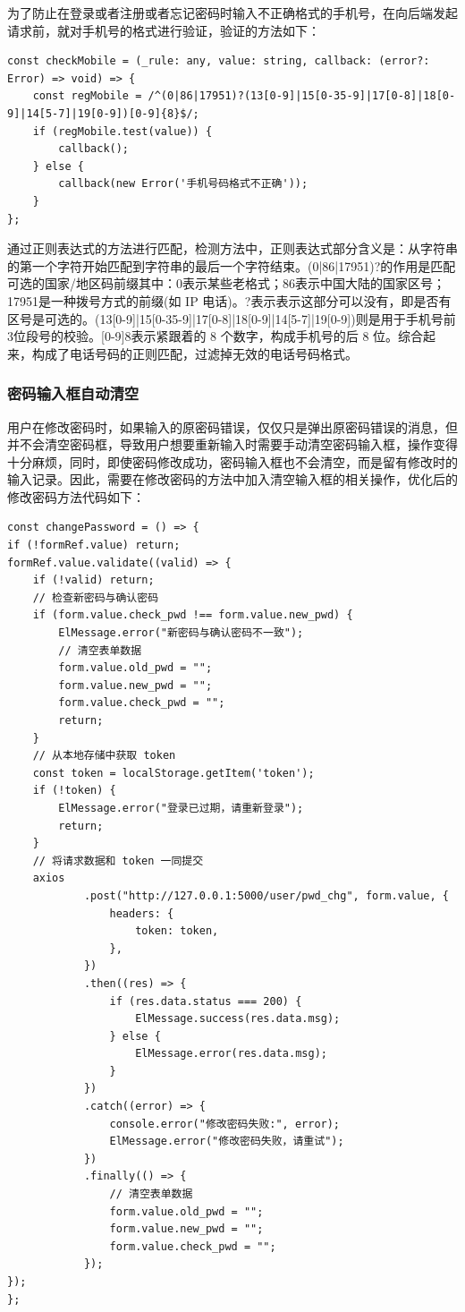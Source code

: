 \documentclass[a4paper,AutoFakeBold={2.7}]{ctexart} %
\begin{document}
为了防止在登录或者注册或者忘记密码时输入不正确格式的手机号，在向后端发起请求前，就对手机号的格式进行验证，验证的方法如下：

\begin{lstlisting}
const checkMobile = (_rule: any, value: string, callback: (error?: Error) => void) => {
    const regMobile = /^(0|86|17951)?(13[0-9]|15[0-35-9]|17[0-8]|18[0-9]|14[5-7]|19[0-9])[0-9]{8}$/;
    if (regMobile.test(value)) {
        callback();
    } else {
        callback(new Error('手机号码格式不正确'));
    }
};
\end{lstlisting}

通过正则表达式的方法进行匹配，检测方法中，正则表达式部分含义是：从字符串的第一个字符开始匹配到字符串的最后一个字符结束。(0|86|17951)?的作用是匹配可选的国家/地区码前缀其中：0表示某些老格式；86表示中国大陆的国家区号；17951是一种拨号方式的前缀(如 IP 电话)。?表示表示这部分可以没有，即是否有区号是可选的。(13[0-9]|15[0-35-9]|17[0-8]|18[0-9]|14[5-7]|19[0-9])则是用于手机号前3位段号的校验。[0-9]{8}表示紧跟着的 8 个数字，构成手机号的后 8 位。综合起来，构成了电话号码的正则匹配，过滤掉无效的电话号码格式。

\subsubsection{密码输入框自动清空}

用户在修改密码时，如果输入的原密码错误，仅仅只是弹出原密码错误的消息，但并不会清空密码框，导致用户想要重新输入时需要手动清空密码输入框，操作变得十分麻烦，同时，即使密码修改成功，密码输入框也不会清空，而是留有修改时的输入记录。因此，需要在修改密码的方法中加入清空输入框的相关操作，优化后的修改密码方法代码如下：

\begin{lstlisting}
const changePassword = () => {
if (!formRef.value) return;
formRef.value.validate((valid) => {
    if (!valid) return;
    // 检查新密码与确认密码
    if (form.value.check_pwd !== form.value.new_pwd) {
        ElMessage.error("新密码与确认密码不一致");
        // 清空表单数据
        form.value.old_pwd = "";
        form.value.new_pwd = "";
        form.value.check_pwd = "";
        return;
    }
    // 从本地存储中获取 token
    const token = localStorage.getItem('token');
    if (!token) {
        ElMessage.error("登录已过期，请重新登录");
        return;
    }
    // 将请求数据和 token 一同提交
    axios
            .post("http://127.0.0.1:5000/user/pwd_chg", form.value, {
                headers: {
                    token: token,
                },
            })
            .then((res) => {
                if (res.data.status === 200) {
                    ElMessage.success(res.data.msg);
                } else {
                    ElMessage.error(res.data.msg);
                }
            })
            .catch((error) => {
                console.error("修改密码失败:", error);
                ElMessage.error("修改密码失败，请重试");
            })
            .finally(() => {
                // 清空表单数据
                form.value.old_pwd = "";
                form.value.new_pwd = "";
                form.value.check_pwd = "";
            });
});
};
\end{lstlisting}
\end{document}
